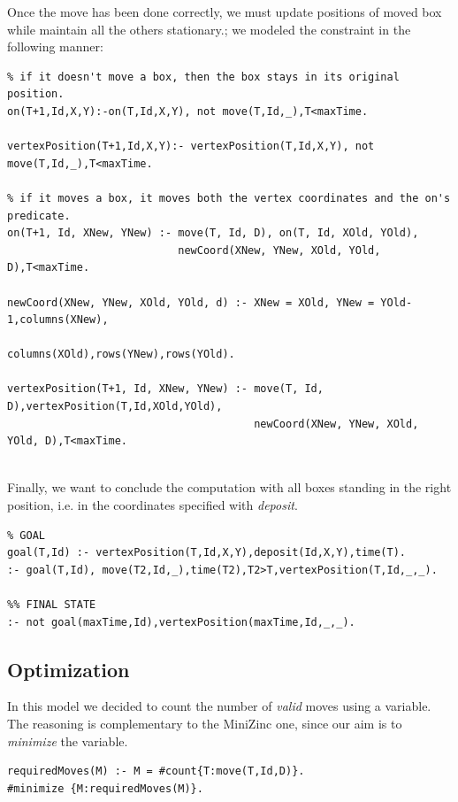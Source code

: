 \documentclass[headinclude, footinclude, abstract=on]{scrarticle}
\begin{document}
Once the move has been done correctly, we must update positions of moved box while maintain all the others stationary.; we modeled the constraint in the following manner:
\begin{verbatim}
% if it doesn't move a box, then the box stays in its original position.
on(T+1,Id,X,Y):-on(T,Id,X,Y), not move(T,Id,_),T<maxTime.

vertexPosition(T+1,Id,X,Y):- vertexPosition(T,Id,X,Y), not move(T,Id,_),T<maxTime.

% if it moves a box, it moves both the vertex coordinates and the on's predicate.
on(T+1, Id, XNew, YNew) :- move(T, Id, D), on(T, Id, XOld, YOld), 
                           newCoord(XNew, YNew, XOld, YOld, D),T<maxTime.
                            
newCoord(XNew, YNew, XOld, YOld, d) :- XNew = XOld, YNew = YOld-1,columns(XNew),
                                       columns(XOld),rows(YNew),rows(YOld).                            
                                       
vertexPosition(T+1, Id, XNew, YNew) :- move(T, Id, D),vertexPosition(T,Id,XOld,YOld), 
                                       newCoord(XNew, YNew, XOld, YOld, D),T<maxTime.
\end{verbatim}
\\
Finally, we want to conclude the computation with all boxes standing in the right position, i.e. in the coordinates specified with \textit{deposit}.
\begin{verbatim}
% GOAL
goal(T,Id) :- vertexPosition(T,Id,X,Y),deposit(Id,X,Y),time(T).
:- goal(T,Id), move(T2,Id,_),time(T2),T2>T,vertexPosition(T,Id,_,_).

%% FINAL STATE
:- not goal(maxTime,Id),vertexPosition(maxTime,Id,_,_).

\end{verbatim}

\subsection{Optimization}
In this model we decided to count the number of \textit{valid} moves using a variable. The reasoning is complementary to the MiniZinc one, since our aim is to \textit{minimize} the variable. 
\begin{verbatim}
requiredMoves(M) :- M = #count{T:move(T,Id,D)}.
#minimize {M:requiredMoves(M)}.
\end{verbatim}
\end{document}
